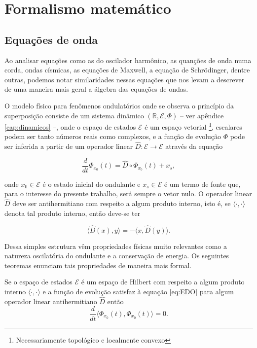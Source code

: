 \chapter{Formalismo matemático}

\section{Equações de onda}

Ao analisar equações como as do oscilador harmônico,
as quanções de onda numa corda, ondas císmicas, as equações de Maxwell,
a equação de Schrödinger, dentre outras,
podemos notar similaridades nessas equações que nos levam a descrever
de uma maneira mais geral a álgebra das equações de ondas.

O modelo físico para fenômenos ondulatórios onde se observa
o princípio da superposição consiste de um sistema dinâmico
$(\mathbb{R}, \mathcal{E}, \Phi)$
-- ver apêndice \ref{cap:dinamicos} --,
onde o espaço de estados $\mathcal{E}$ é um espaço vetorial%
\footnote{Necessariamente topológico e localmente convexo},
escalares podem ser tanto números reais como complexos,
e a função de evolução $\Phi$ pode ser inferida a partir
de um operador linear
$\hat{D}:\mathcal{E}\rightarrow\mathcal{E}$ através da equação

\begin{equation}\label{eq:EDO}
   \frac{d}{dt} \Phi_{x_0}(t) = \hat{D} \circ \Phi_{x_0}(t) + x_s,
\end{equation}

\noindent
onde ${x_0}\in\mathcal{E}$ é o estado inicial do ondulante
e $x_s\in\mathcal{E}$ é um termo de fonte
que, para o interesse do presente trabalho, será sempre o vetor nulo.
O operador linear $\hat{D}$ deve ser
antihermitiano com respeito a algum produto interno, isto é,
se $\langle\cdot,\cdot\rangle$ denota tal produto interno, então deve-se ter

\begin{equation}
   \langle \hat{D}(x), y\rangle = -\langle x, \hat{D}(y)\rangle.
\end{equation}

Dessa simples estrutura vêm propriedades físicas muito relevantes
como a natureza oscilatória do ondulante e a conservação de energia.
Os seguintes teoremas enunciam tais propriedades de maneira mais formal.

\begin{teorema}
   Se o espaço de estados $\mathcal{E}$
   é um espaço de Hilbert com respeito a algum produto interno
   $\langle\cdot,\cdot\rangle$
   e a função de evolução satisfaz à equação \ref{eq:EDO}
   para algum operador linear antihermitiano $\hat{D}$
   então
   $$
      \frac{d}{dt} \langle \Phi_{x_0}(t), \Phi_{x_0}(t) \rangle = 0.
   $$
\end{teorema}

